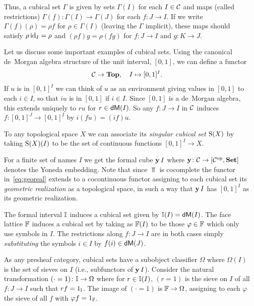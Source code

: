 Thus, a cubical set $\Gamma$ is given by sets $\Gamma (I)$ for each $I
\in \mathcal{C}$ and maps (called restrictions) $\Gamma (f) \colon \Gamma (I)
\to \Gamma (J)$ for each $f \colon J \to I$.  If we write $\Gamma (f)
(\rho) = \rho f$ for $\rho \in \Gamma (I)$ (leaving the $\Gamma$
implicit), these maps should satisfy $\rho \, \mathrm{id}_I = \rho$ and $(\rho
f) g = \rho (f g)$ for $f \colon J \to I$ and $g \colon K \to J$.

Let us discuss some important examples of cubical sets.  Using the
canonical de~Morgan algebra structure of the unit interval, $[0,1]$,
we can define a functor
%
\begin{equation}
  \label{eq:georeal}
  \mathcal{C} \to \mathbf{Top}, \quad I \mapsto [0,1]^I.
\end{equation}
%
If $u$ is in $[0,1]^I$ we can think of $u$ as an environment giving
values in $[0,1]$ to each $i \in I$, so that $iu$ is in $[0,1]$ if $i
\in I$.  Since $[0,1]$ is a de~Morgan algebra, this extends uniquely
to $r u$ for $r \in {\sf dM} (I)$. So any $f \colon J \to I$ in $\mathcal{C}$
induces $f \colon [0,1]^J \to [0,1]^I$ by $i(fu) = (if)u$.

To any topological space $X$ we can associate its \emph{singular
  cubical set} $\operatorname{\mathrm{S}}(X)$ by taking $\operatorname{\mathrm{S}}(X) (I)$ to be the set of
continuous functions $[0,1]^I \to X$.

For a finite set of names $I$ we get the formal cube $\operatorname{\mathbf{y}} I$ where
$\operatorname{\mathbf{y}} \colon \mathcal{C} \to [\mathcal{C}^{\mathrm{op}},\mathbf{Set}]$ denotes the Yoneda embedding.
Note that since $\Top$ is cocomplete the functor in~\eqref{eq:georeal}
extends to a cocontinuous functor assigning to each cubical set its
\emph{geometric realization} as a topological space, in such a way that
$\operatorname{\mathbf{y}} I$ has $[0,1]^I$ as its geometric realization.

The formal interval $\mathbb{I}$ induces a cubical set given by $\mathbb{I} (I) =
{\sf dM} (I)$.  The face lattice $\mathbb{F}$ induces a cubical set by taking as
$\mathbb{F} (I)$ to be those $\varphi \in \mathbb{F}$ which only use symbols in $I$.
The restrictions along $f \colon J \to I$ are in both cases simply
\emph{substituting} the symbols $i \in I$ by $f(i) \in
{\sf dM}(J)$.

As any presheaf category, cubical sets have a subobject classifier
$\Omega$ where $\Omega (I)$ is the set of sieves on $I$ (i.e.,
subfunctors of $\operatorname{\mathbf{y}} I$).  Consider the natural transformation
$(\cdot=1) \colon \mathbb{I} \to \Omega$ where for $r \in \mathbb{I} (I)$, $(r = 1)$
is the sieve on $I$ of all $f \colon J \to I$ such that $r f = 1_{\mathbb{I}}$.
The image of $(\cdot = 1)$ is $\mathbb{F} \to \Omega$, assigning to each
$\varphi$ the sieve of all $f$ with $\varphi f = 1_{\mathbb{F}}$.



